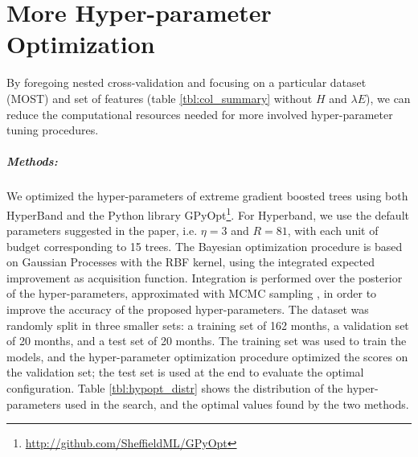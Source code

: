 \documentclass[a4paper]{book}
\begin{document}
\chapter{More Hyper-parameter Optimization}
By foregoing nested cross-validation and focusing on a particular dataset (MOST) and set of features (table \ref{tbl:col_summary} without $H$ and $\lambda E$), we can reduce the computational resources needed for more involved hyper-parameter tuning procedures.

\paragraph{Methods:} We optimized the hyper-parameters of extreme gradient boosted trees \citep{xgboost} using both HyperBand \citep{hyperband} and the Python library GPyOpt\footnote{\url{http://github.com/SheffieldML/GPyOpt}}. For Hyperband, we use the default parameters suggested in the paper, i.e. $\eta=3$ and $R=81$, with each unit of budget corresponding to 15 trees. The Bayesian optimization procedure is based on Gaussian Processes with the RBF kernel, using the integrated expected improvement as acquisition function. Integration is performed over the posterior of the hyper-parameters, approximated with MCMC sampling \citep{practical_gphypopt}, in order to improve the accuracy of the proposed hyper-parameters. The dataset was randomly split in three smaller sets: a training set of 162 months, a validation set of 20 months, and a test set of 20 months. The training set was used to train the models, and the hyper-parameter optimization procedure optimized the scores on the validation set; the test set is used at the end to evaluate the optimal configuration. Table \ref{tbl:hypopt_distr} shows the distribution of the hyper-parameters used in the search, and the optimal values found by the two methods.
\end{document}
